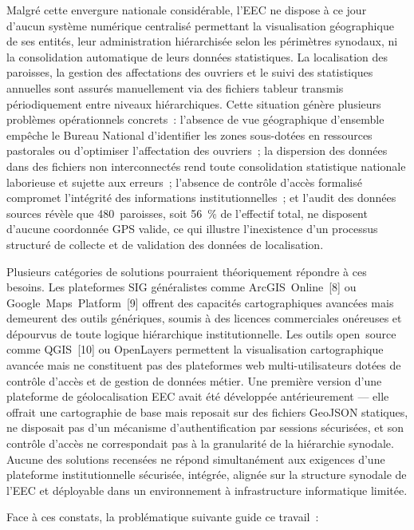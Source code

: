 \documentclass[12pt, a4paper]{report}
\begin{document}
Malgré cette envergure nationale considérable, l'EEC ne dispose à ce jour d'aucun
système numérique centralisé permettant la visualisation géographique de ses
entités, leur administration hiérarchisée selon les périmètres synodaux, ni la
consolidation automatique de leurs données statistiques. La localisation des
paroisses, la gestion des affectations des ouvriers et le suivi des statistiques
annuelles sont assurés manuellement via des fichiers tableur transmis
périodiquement entre niveaux hiérarchiques. Cette situation génère plusieurs
problèmes opérationnels concrets~: l'absence de vue géographique d'ensemble
empêche le Bureau National d'identifier les zones sous-dotées en ressources
pastorales ou d'optimiser l'affectation des ouvriers~; la dispersion des données
dans des fichiers non interconnectés rend toute consolidation statistique nationale
laborieuse et sujette aux erreurs~; l'absence de contrôle d'accès formalisé
compromet l'intégrité des informations institutionnelles~; et l'audit des données
sources révèle que 480~paroisses, soit 56~\% de l'effectif total, ne disposent
d'aucune coordonnée GPS valide, ce qui illustre l'inexistence d'un processus
structuré de collecte et de validation des données de localisation.

Plusieurs catégories de solutions pourraient théoriquement répondre à ces besoins.
Les plateformes SIG généralistes comme ArcGIS~Online~[8] ou
Google~Maps~Platform~[9] offrent des capacités cartographiques
avancées mais demeurent des outils génériques, soumis à des licences commerciales
onéreuses et dépourvus de toute logique hiérarchique institutionnelle. Les outils
open~source comme QGIS~[10] ou OpenLayers permettent la visualisation
cartographique avancée mais ne constituent pas des plateformes web multi-utilisateurs
dotées de contrôle d'accès et de gestion de données métier. Une première version
d'une plateforme de géolocalisation EEC avait été développée antérieurement --- elle
offrait une cartographie de base mais reposait sur des fichiers GeoJSON statiques,
ne disposait pas d'un mécanisme d'authentification par sessions sécurisées, et son
contrôle d'accès ne correspondait pas à la granularité de la hiérarchie synodale.
Aucune des solutions recensées ne répond simultanément aux exigences d'une
plateforme institutionnelle sécurisée, intégrée, alignée sur la structure synodale
de l'EEC et déployable dans un environnement à infrastructure informatique limitée.

\medskip

Face à ces constats, la problématique suivante guide ce travail~:
\end{document}
